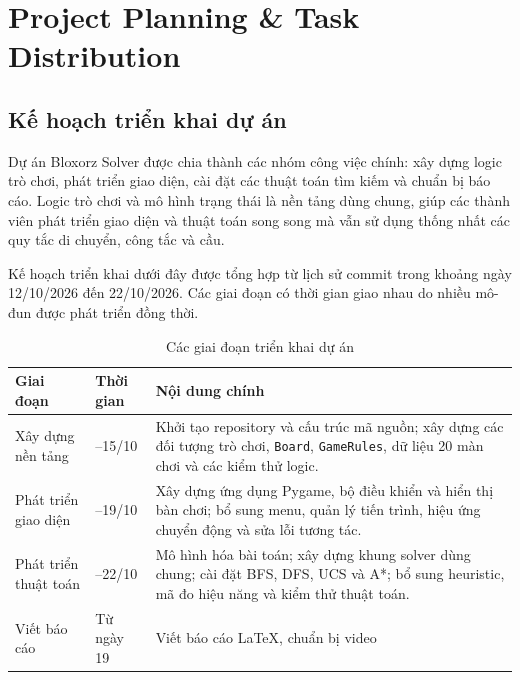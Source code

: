 \section{Project Planning \& Task Distribution}

\subsection{Kế hoạch triển khai dự án}

Dự án Bloxorz Solver được chia thành các nhóm công việc chính: xây dựng
logic trò chơi, phát triển giao diện, cài đặt các thuật toán tìm kiếm và
chuẩn bị báo cáo. Logic trò chơi và mô hình trạng thái là nền tảng dùng
chung, giúp các thành viên phát triển giao diện và thuật toán song song
mà vẫn sử dụng thống nhất các quy tắc di chuyển, công tắc và cầu.

Kế hoạch triển khai dưới đây được tổng hợp từ lịch sử commit trong
khoảng ngày 12/10/2026 đến 22/10/2026. Các giai đoạn có thời gian giao
nhau do nhiều mô-đun được phát triển đồng thời.

\begin{table}[H]
    \centering
    \caption{Các giai đoạn triển khai dự án}
    \label{tab:project_timeline}
    \small
    \renewcommand{\arraystretch}{1.2}
    \begin{tabularx}{\textwidth}{@{}>{\raggedright\arraybackslash}p{2.7cm}
        >{\raggedright\arraybackslash}p{2.5cm}
        >{\raggedright\arraybackslash}X@{}}
        \toprule
        \textbf{Giai đoạn} & \textbf{Thời gian} & \textbf{Nội dung chính} \\
        \midrule
        Xây dựng nền tảng & 12--15/10 &
        Khởi tạo repository và cấu trúc mã nguồn; xây dựng các đối tượng
        trò chơi, \texttt{Board}, \texttt{GameRules}, dữ liệu 20 màn chơi
        và các kiểm thử logic. \\
        \midrule
        Phát triển giao diện & 17--19/10 &
        Xây dựng ứng dụng Pygame, bộ điều khiển và hiển thị bàn chơi;
        bổ sung menu, quản lý tiến trình, hiệu ứng chuyển động và sửa
        lỗi tương tác. \\
        \midrule
        Phát triển thuật toán & 19--22/10 &
        Mô hình hóa bài toán; xây dựng khung solver dùng chung; cài đặt
        BFS, DFS, UCS và A*; bổ sung heuristic, mã đo hiệu năng và
        kiểm thử thuật toán. \\
        \midrule
        Viết báo cáo& Từ ngày 19 &
        Viết báo cáo LaTeX, chuẩn bị video\\
        \bottomrule
    \end{tabularx}
\end{table}

